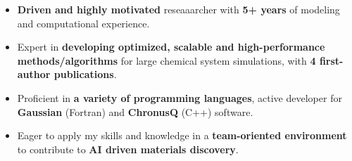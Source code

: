 
\begin{itemize}[label=$\bullet$]
    \item \textbf{Driven and highly motivated} reseaaarcher with \textbf{5+ years} of modeling and computational experience.
    \item Expert in \textbf{developing optimized, scalable and high-performance methods/algorithms} for large chemical system simulations, with \textbf{4 first-author publications}.
    \item Proficient in \textbf{a variety of programming languages}, active developer for \textbf{Gaussian} (Fortran) and \textbf{ChronusQ} (C++) software.
    \item Eager to apply my skills and knowledge in a \textbf{team-oriented environment} to contribute to \textbf{AI driven materials discovery}.
\end{itemize}